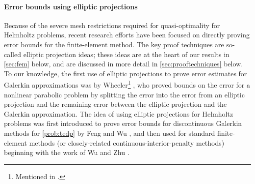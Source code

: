\paragraph{Error bounds using elliptic projections} Because of the severe mesh restrictions required for quasi-optimality for Helmholtz problems, recent research efforts have been focused on directly proving error bounds for the finite-element method. The key proof techniques are so-called elliptic projection ideas; these ideas are at the heart of our results in \cref{sec:fem} below, and are discussed in more detail in \cref{sec:prooftechniques} below. To our knowledge, the first use of elliptic projections to prove error estimates for Galerkin approximations was by Wheeler\footnote{Mentioned in \cite{MaNo:03}.} \cite[Theorem 3.1 ff.]{Wh:73}, who proved bounds on the error for a nonlinear parabolic problem by splitting the error into the error from an elliptic projection and the remaining error between the elliptic projection and the Galerkin approximation. The idea of using elliptic projections for Helmholtz problems was first introduced to prove error bounds for discontinuous Galerkin methods for \cref{prob:tedp} by Feng and Wu \cite{FeWu:09,FeWu:11}, and then used for standard finite-element methods (or closely-related continuous-interior-penalty methods) beginning with the work of Wu and Zhu \cite{ZhWu:13,Wu:14}.

